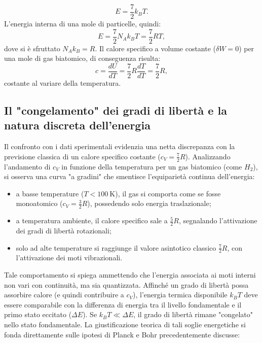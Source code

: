 \documentclass[a4paper,11pt]{report}
\begin{document}
    \begin{equation}
        E = \frac{7}{2}k_BT.
    \end{equation}
    L'energia interna di una mole di particelle, quindi:
        \begin{equation}
        E = \frac{7}{2}N_Ak_BT = \frac{7}{2}RT,
    \end{equation}
dove si è sfruttato $N_Ak_B = R$. Il calore specifico a volume costante ($\delta W = 0$) per una mole di gas biatomico, di conseguenza risulta:
        \begin{equation}
        c = \frac{dU}{dT} = \frac{7}{2}R\frac{dT}{dT} = \frac{7}{2}R,
    \end{equation}
    costante al variare della temperatura.  
   

    
    
    \subsection{Il "congelamento" dei gradi di libertà e la natura discreta dell'energia}
Il confronto con i dati sperimentali evidenzia una netta discrepanza con la previsione classica di un calore specifico costante ($c_V = \frac{7}{2}R$). Analizzando l'andamento di $c_V$ in funzione della temperatura per un gas biatomico (come $H_2$), si osserva una curva "a gradini" che smentisce l'equiparietà continua dell'energia:
\begin{itemize}
    \item a basse temperature ($T < \SI{100}{\kelvin}$), il gas si comporta come se fosse monoatomico ($c_V = \frac{3}{2}R$), possedendo solo energia traslazionale;
    \item a temperatura ambiente, il calore specifico sale a $\frac{5}{2}R$, segnalando l'attivazione dei gradi di libertà rotazionali;
    \item solo ad alte temperature si raggiunge il valore asintotico classico $\frac{7}{2}R$, con l'attivazione dei moti vibrazionali.
\end{itemize}
Tale comportamento si spiega ammettendo che l'energia associata ai moti interni non vari con continuità, ma sia quantizzata. Affinché un grado di libertà possa assorbire calore (e quindi contribuire a $c_V$), l'energia termica disponibile $k_B T$ deve essere comparabile con la differenza di energia tra il livello fondamentale e il primo stato eccitato ($\Delta E$). Se $k_B T \ll \Delta E$, il grado di libertà rimane "congelato" nello stato fondamentale.
La giustificazione teorica di tali soglie energetiche si fonda direttamente sulle ipotesi di Planck e Bohr precedentemente discusse:
\end{document}
